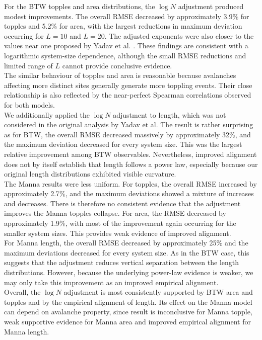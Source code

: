 For the BTW topples and area distributions, the $\log N$ adjustment produced modest improvements. The overall RMSE decreased by approximately 3.9\% for topples and 5.2\% for area, with the largest reductions in maximum deviation occurring for $L=10$ and $L=20$. The adjusted exponents were also closer to the values near one proposed by Yadav et al. \cite{Yadav2022FiniteSize}. These findings are consistent with a logarithmic system-size dependence, although the small RMSE reductions and limited range of $L$ cannot provide conclusive evidence.\\

The similar behaviour of topples and area is reasonable because avalanches affecting more distinct sites generally generate more toppling events. Their close relationship is also reflected by the near-perfect Spearman correlations observed for both models.\\

We additionally applied the $\log N$ adjustment to length, which was not considered in the original analysis by Yadav et al. The result is rather surprising as for BTW, the overall RMSE decreased massively by approximately 32\%, and the maximum deviation decreased for every system size. This was the largest relative improvement among BTW observables. Nevertheless, improved alignment does not by itself establish that length follows a power law, especially because our original length distributions exhibited visible curvature.\\

The Manna results were less uniform. For topples, the overall RMSE increased by approximately 2.7\%, and the maximum deviations showed a mixture of increases and decreases. There is therefore no consistent evidence that the adjustment improves the Manna topples collapse. For area, the RMSE decreased by approximately 1.9\%, with most of the improvement again occurring for the smaller system sizes. This provides weak evidence of improved alignment. \\

For Manna length, the overall RMSE decreased by approximately 25\% and the maximum deviations decreased for every system size. As in the BTW case, this suggests that the adjustment reduces vertical separation between the length distributions. However, because the underlying power-law evidence is weaker, we may only take this improvement as an improved empirical alignment.\\

Overall, the $\log N$ adjustment is most consistently supported by BTW area and topples and by the empirical alignment of length. Its effect on the Manna model can depend on avalanche property, since result is inconclusive for Manna topple, weak supportive evidence for Manna area and improved empirical alignment for Manna length.


